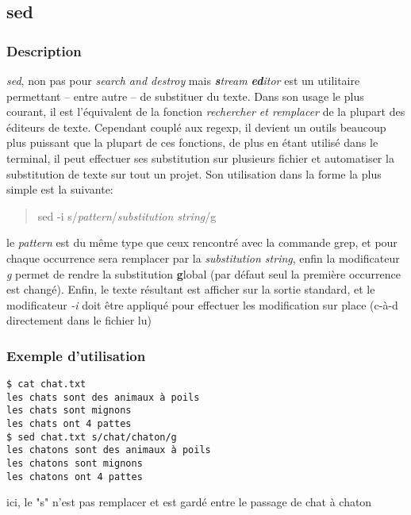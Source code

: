 \subsection*{sed}
\subsubsection*{Description}
\emph{sed}, non pas pour \emph{search and destroy} mais \emph{\textbf{s}tream \textbf{ed}itor} est un utilitaire permettant -- entre autre -- de substituer du texte.
Dans son usage le plus courant, il est l'équivalent de la fonction \emph{rechercher et remplacer} de la plupart des éditeurs de texte.
Cependant couplé aux regexp, il devient un outils beaucoup plus puissant que la plupart de ces fonctions, de plus en étant utilisé dans le terminal, il peut effectuer ses substitution sur plusieurs fichier et automatiser la substitution de texte sur tout un projet.
Son utilisation dans la forme la plus simple est la suivante:
\begin{quote}
sed -i s/\emph{pattern}/\emph{substitution string}/g
\end{quote}

le \emph{pattern} est du même type que ceux rencontré avec la commande grep, et pour chaque occurrence sera remplacer par la \emph{substitution string}, enfin la modificateur \emph{g} permet de rendre la substitution \textbf{g}lobal (par défaut seul la première occurrence est changé).
Enfin, le texte résultant est afficher sur la sortie standard, et le modificateur \emph{-i} doit être appliqué pour effectuer les modification sur place (c-à-d directement dans le fichier lu)

\subsubsection*{Exemple d'utilisation}

\begin{lstlisting}
$ cat chat.txt
les chats sont des animaux à poils
les chats sont mignons
les chats ont 4 pattes
$ sed chat.txt s/chat/chaton/g
les chatons sont des animaux à poils
les chatons sont mignons
les chatons ont 4 pattes
\end{lstlisting}

ici, le "s" n'est pas remplacer et est gardé entre le passage de chat à chaton